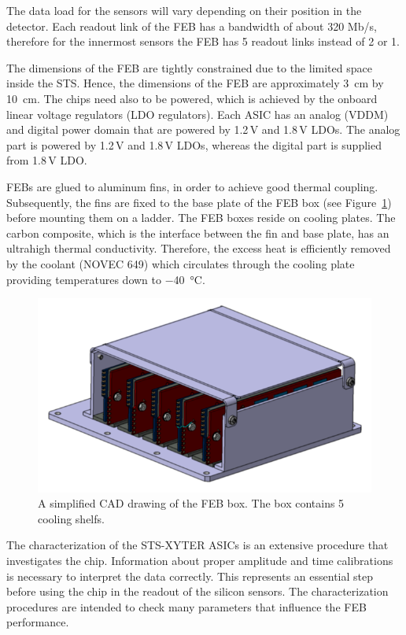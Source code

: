 The data load for the sensors will vary depending on their position in the detector. Each readout link of the \gls{FEB} has a bandwidth of about 320 Mb/s, therefore for the innermost sensors the \gls{FEB} has 5 readout links instead of 2 or 1. 

The dimensions of the \gls{FEB} are tightly constrained due to the limited space inside the \gls{STS}. Hence, the dimensions of the \gls{FEB} are approximately \SI{3}{\centi\metre} by \SI{10}{\centi\metre}. The chips need also to be powered, which is achieved by the onboard linear voltage regulators (\gls{LDO} regulators). Each \gls{ASIC} has an analog (VDDM) and digital power domain that are powered by 1.2\,V and 1.8\,V \glspl{LDO}. The analog part is powered by 1.2\,V and 1.8\,V \glspl{LDO}, whereas the digital part is supplied from 1.8\,V \gls{LDO}.

\glspl{FEB} are glued to aluminum fins, in order to achieve good thermal coupling. Subsequently, the fins are fixed to the base plate of the \gls{FEB} box (see Figure~\ref{feb_box}) before mounting them on a ladder. The \gls{FEB} boxes reside on cooling plates. The carbon composite, which is the interface between the fin and base plate, has an ultrahigh thermal conductivity. Therefore, the excess heat is efficiently removed by the coolant (NOVEC 649) which circulates through the cooling plate providing temperatures down to \SI{-40}{\celsius}. 

\begin{figure}[!h]
\centering
\includegraphics[width=0.55\columnwidth]{Chapter2/images/feb_box_1.png}
\caption{A simplified CAD drawing of the \gls{FEB} box. The box contains 5 cooling shelfs.}
\label{feb_box}
\end{figure}


The characterization of the STS-XYTER ASICs is an extensive procedure that investigates the chip. Information about proper amplitude and time calibrations is necessary to interpret the data correctly. This represents an essential step before using the chip in the readout of the silicon sensors. The characterization procedures are intended to
check many parameters that influence the \gls{FEB} performance. 


